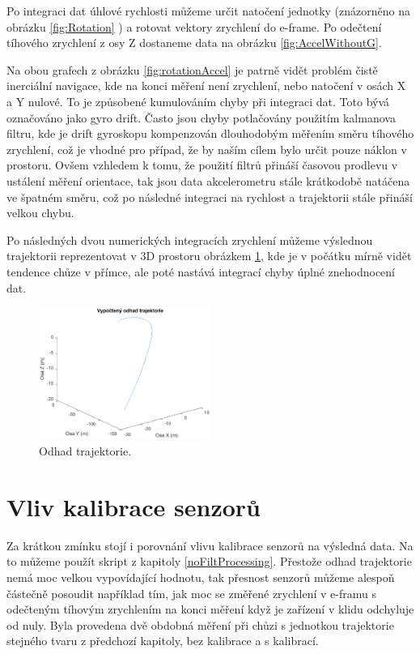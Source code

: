 Po integraci dat úhlové rychlosti můžeme určit natočení jednotky (znázorněno na obrázku \ref{fig:Rotation} ) a rotovat vektory zrychlení do e-frame. Po odečtení tíhového zrychlení z osy Z dostaneme data na obrázku \ref{fig:AccelWithoutG}.

Na obou grafech z obrázku \ref{fig:rotationAccel} je patrně vidět problém čistě inerciální navigace, kde na konci měření není zrychlení, nebo natočení v osách X a Y nulové. To je způsobené kumulováním chyby při integraci dat. Toto bývá označováno jako gyro drift. Často jsou chyby potlačovány použitím kalmanova filtru, kde je drift gyroskopu kompenzován dlouhodobým měřením směru tíhového zrychlení, což je vhodné pro případ, že by naším cílem bylo určit pouze náklon v prostoru. Ovšem vzhledem k tomu, že použití filtrů přináší časovou prodlevu v ustálení měření orientace, tak jsou data akcelerometru stále krátkodobě natáčena ve špatném směru, což po následné integraci na rychlost a trajektorii stále přináší velkou chybu.

Po následných dvou numerických integracích zrychlení můžeme výslednou trajektorii reprezentovat v 3D prostoru obrázkem \ref{fig:Trajectory}, kde je v počátku mírně vidět tendence chůze v přímce, ale poté nastává integrací chyby úplné znehodnocení dat. 

\begin{figure}[h]
     \centering
         \includegraphics[width=0.5\textwidth]{obrazky/matlab/1measTraj}
         \caption{Odhad trajektorie.}
        \label{fig:Trajectory}
\end{figure}

\section{Vliv kalibrace senzorů}
Za krátkou zmínku stojí i porovnání vlivu kalibrace senzorů na výsledná data. Na to můžeme použít skript z kapitoly \ref{noFiltProcessing}. Přestože odhad trajektorie nemá moc velkou vypovídající hodnotu, tak přesnost senzorů můžeme alespoň částečně posoudit například tím, jak moc se změřené zrychlení v e-framu s odečteným tíhovým zrychlením na konci měření když je zařízení v klidu odchyluje od nuly. Byla provedena dvě obdobná měření při chůzi s jednotkou trajektorie stejného tvaru z předchozí kapitoly, bez kalibrace a s kalibrací.

